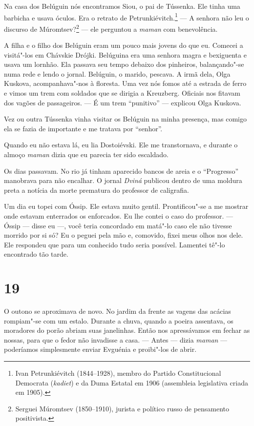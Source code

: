 Na casa dos Belúguin nós encontramos Siou, o pai de Tússenka. Ele tinha
uma barbicha e usava óculos. Era o retrato de Petrunkiévitch.\footnote{Ivan
  Petrunkiévitch (1844--1928), membro do Partido Constitucional
  Democrata (\emph{kadiet}) e da Duma Estatal em 1906 (assembleia
  legislativa criada em 1905).} --- A senhora não leu o discurso de
Múromtsev?\footnote{Serguei Múromtsev (1850--1910), jurista e político
  russo de pensamento positivista.} --- ele perguntou a \emph{maman} com
benevolência.

A filha e o filho dos Belúguin eram um pouco mais jovens do que eu.
Comecei a visitá"-los em Chávskie Drójki. Belúguina era uma senhora magra
e bexiguenta e usava um lornhão. Ela passava seu tempo debaixo dos
pinheiros, balançando"-se numa rede e lendo o jornal. Belúguin, o marido,
pescava. A irmã dela, Olga Kuskova, acompanhava"-nos à floresta. Uma vez
nós fomos até a estrada de ferro e vimos um trem com soldados que se
dirigia a Kreuzberg. Oficiais nos fitavam dos vagões de passageiros. ---
É um trem ``punitivo'' --- explicou Olga Kuskova.

Vez ou outra Tússenka vinha visitar os Belúguin na minha presença, mas
comigo ela se fazia de importante e me tratava por ``senhor''.

Quando eu não estava lá, eu lia Dostoiévski. Ele me transtornava, e
durante o almoço \emph{maman} dizia que eu parecia ter sido escaldado.

Os dias passavam. No rio já tinham aparecido bancos de areia e o
``Progresso'' manobrava para não encalhar. O jornal \emph{Dviná}
publicou dentro de uma moldura preta a notícia da morte prematura do
professor de caligrafia.

Um dia eu topei com Óssip. Ele estava muito gentil. Prontificou"-se a me
mostrar onde estavam enterrados os enforcados. Eu lhe contei o caso do
professor. --- Óssip --- disse eu ---, você teria concordado em matá"-lo
caso ele não tivesse morrido por si só? Eu o peguei pela mão e,
comovido, fixei meus olhos nos dele. Ele respondeu que para um conhecido
tudo seria possível. Lamentei tê"-lo encontrado tão tarde.

\section{19}

O outono se aproximava de novo. No jardim da frente as vagens das
acácias rompiam"-se com um estalo. Durante a chuva, quando a poeira
assentava, os moradores do porão abriam suas janelinhas. Então nos
apressávamos em fechar as nossas, para que o fedor não invadisse a casa.
--- Antes --- dizia \emph{maman} --- poderíamos simplesmente enviar
Evguénia e proibi"-los de abrir.

